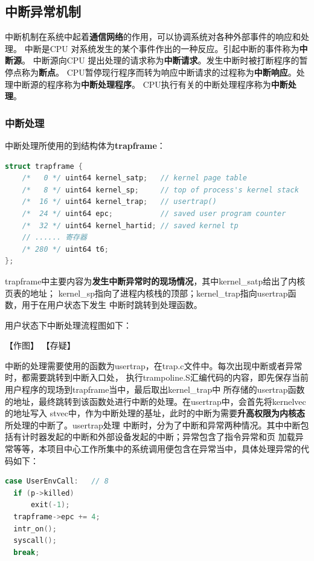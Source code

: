 \documentclass[UTF8,a4paper,10pt]{ctexart}
\begin{document}
\subsection{中断异常机制}

中断机制在系统中起着\textbf{通信网络}的作用，可以协调系统对各种外部事件的响应和处理。
中断是CPU 对系统发生的某个事件作出的一种反应。引起中断的事件称为\textbf{中断源}。
中断源向CPU 提出处理的请求称为\textbf{中断请求}。发生中断时被打断程序的暂停点称为\textbf{断点}。
CPU暂停现行程序而转为响应中断请求的过程称为\textbf{中断响应}。处理中断源的程序称为\textbf{中断处理程序}。
CPU执行有关的中断处理程序称为\textbf{中断处理}。

\subsubsection{中断处理}

中断处理所使用的到结构体为\textbf{trapframe}：

\begin{lstlisting}[title=trapframe结构体,frame=trbl,language={C}]
  struct trapframe {
    /*   0 */ uint64 kernel_satp;   // kernel page table
    /*   8 */ uint64 kernel_sp;     // top of process's kernel stack
    /*  16 */ uint64 kernel_trap;   // usertrap()
    /*  24 */ uint64 epc;           // saved user program counter
    /*  32 */ uint64 kernel_hartid; // saved kernel tp
    // ...... 寄存器
    /* 280 */ uint64 t6;
};
  \end{lstlisting}

trapframe中主要内容为\textbf{发生中断异常时的现场情况}，其中kernel\_satp给出了内核页表的地址；
kernel\_sp指向了进程内核栈的顶部；kernel\_trap指向usertrap函数，用于在用户状态下发生
中断时跳转到处理函数。

用户状态下中断处理流程图如下：

【作图】
【存疑】

中断的处理需要使用的函数为usertrap，在trap.c文件中。每次出现中断或者异常时，都需要跳转到中断入口处，
执行trampoline.S汇编代码的内容，即先保存当前用户程序的现场到trapframe当中，最后取出kernel\_trap中
所存储的usertrap函数的地址，最终跳转到该函数处进行中断的处理。在usertrap中，会首先将kernelvec的地址写入
stvec中，作为中断处理的基址，此时的中断为需要\textbf{升高权限为内核态}所处理的中断了。usertrap处理
中断时，分为了中断和异常两种情况。其中中断包括有计时器发起的中断和外部设备发起的中断；异常包含了指令异常和页
加载异常等等，本项目中心工作所集中的系统调用便包含在异常当中，具体处理异常的代码如下：

\begin{lstlisting}[title=系统调用异常,frame=trbl,language={C}]
  case UserEnvCall:   // 8
  if (p->killed)
      exit(-1);
  trapframe->epc += 4;
  intr_on();
  syscall();
  break;
  \end{lstlisting}
\end{document}
